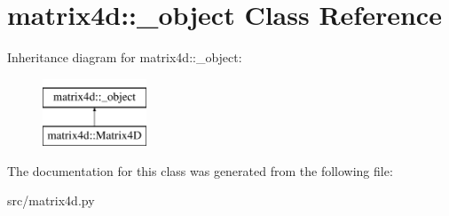 \hypertarget{classmatrix4d_1_1__object}{
\section{matrix4d::\_\-object Class Reference}
\label{d5/df5/classmatrix4d_1_1__object}
}
Inheritance diagram for matrix4d::\_\-object:\begin{figure}[H]
\begin{center}
\leavevmode
\includegraphics[height=2cm]{d5/df5/classmatrix4d_1_1__object}
\end{center}
\end{figure}


The documentation for this class was generated from the following file:\begin{DoxyCompactItemize}
\item 
src/matrix4d.py\end{DoxyCompactItemize}
